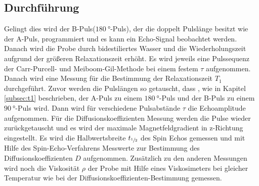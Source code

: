\subsection{Durchführung}
Gelingt dies wird der B-Puls($\SI{180}{\degree}$-Puls),
der die doppelt Pulslänge besitzt wie der A-Puls,
programmiert und es kann ein Echo-Signal beobachtet werden.
Danach wird die Probe durch bidestiliertes Wasser
und die Wiederholungszeit aufgrund der größeren Relaxationszeit
erhöht. Es wird jeweils eine Pulssequenz der Carr-Purcell-
und Meiboom-Gil-Methode bei einem festem $\tau$ aufgenommen.
Danach wird eine Messung für die Bestimmung der Relaxationszeit $T_1$
durchgeführt. Zuvor werden die Pulslängen so getauscht, dass , wie in Kapitel \ref{subsec:t1}
beschrieben, der A-Puls zu einem $\SI{180}{\degree}$-Puls
und der B-Puls zu einem $\SI{90}{\degree}$-Puls wird.
Dann wird für verschiedene Pulsabstände $\tau$ die Echoamplitude aufgenommen.
Für die Diffusionskoeffizienten Messung
werden die Pulse wieder zurückgetauscht
und es wird der maximale Magnetfeldgradient
in z-Richtung eingestellt. Es wird die Halbwertsbreite $t_{\sfrac{1}{2}}$
des Spin Echos gemessen und mit Hilfe
des Spin-Echo-Verfahrens Messwerte zur Bestimmung
des Diffusionskoeffizienten $D$ aufgenommen.
Zusätzlich zu den anderen Messungen
wird noch die Viskosität $\rho$
der Probe mit Hilfe eines Viskosimeters
bei gleicher Temperatur wie bei der
Diffusionskoeffizienten-Bestimmung gemessen.
